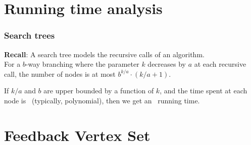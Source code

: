 \section{Running time analysis}

\begin{frame}
 \frametitle{Search trees}
 
 \textbf{Recall}: A \alert{search tree} models the recursive calls of an algorithm.\\
 For a $b$-way branching where the parameter $k$ decreases by $a$ at each recursive call, the number of nodes is at most $b^{k/a}\cdot (k/a+1)$.
 
 \begin{center}
 \end{center}
 
 If $k/a$ and $b$ are upper bounded by a function of $k$,
 and the time spent at each node is \FPT\ (typically, polynomial),
 then we get an \FPT\ running time.

\end{frame}


\section{Feedback Vertex Set}

